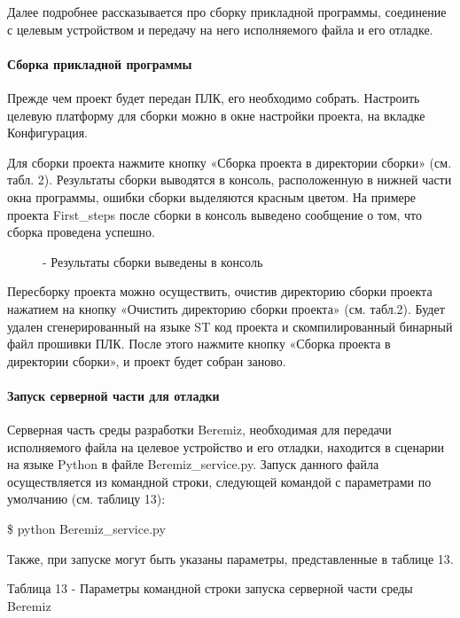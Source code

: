 \documentclass[letterpaper,10pt,russian]{sphinxmanual}
\begin{document}
Далее подробнее рассказывается про сборку прикладной программы,
соединение с целевым устройством и передачу на него исполняемого файла и
его отладке.


\paragraph{Сборка прикладной программы}
\label{usage_guide/work_with_project:id15}
Прежде чем проект будет передан ПЛК, его необходимо собрать. Настроить
целевую платформу для сборки можно в окне настройки проекта,
на вкладке Конфигурация.

Для сборки проекта нажмите кнопку «Сборка проекта в директории сборки»
(см. табл. 2). Результаты сборки
выводятся в консоль, расположенную в нижней части окна программы, ошибки
сборки выделяются красным цветом. На примере проекта First\_steps после
сборки в консоль выведено сообщение о том, что сборка проведена успешно.
\begin{figure}[htbp]
\centering
\capstart

\noindent{}
\caption{- Результаты сборки выведены в консоль}\label{usage_guide/work_with_project:image209}\end{figure}

Пересборку проекта можно осуществить, очистив директорию сборки проекта
нажатием на кнопку «Очистить директорию сборки проекта» (см. табл.2).
Будет удален сгенерированный на языке ST код проекта и скомпилированный
бинарный файл прошивки ПЛК. После этого нажмите кнопку «Сборка проекта в
директории сборки», и проект будет собран заново.


\paragraph{Запуск серверной части для отладки}
\label{usage_guide/work_with_project:id16}
Серверная часть среды разработки Beremiz, необходимая для передачи
исполняемого файла на целевое устройство и его отладки, находится в
сценарии на языке Python в файле Beremiz\_service.py. Запуск данного
файла осуществляется из командной строки, следующей командой с
параметрами по умолчанию (см. таблицу 13):

\$ python Beremiz\_service.py

Также, при запуске могут быть указаны параметры, представленные в
таблице 13.

Таблица 13 - Параметры командной строки запуска серверной части среды
Beremiz
\end{document}

